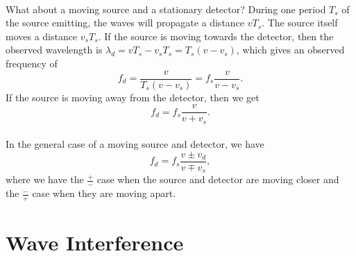 \documentclass[../classical_mechanics.tex]{subfiles}
\begin{document}
        \paragraph{}
        What about a moving source and a stationary detector?
        During one period $T_s$ of the source emitting, the waves will propagate a distance $vT_s$.
        The source itself moves a distance $v_sT_s$.
        If the source is moving towards the detector, then the observed wavelength is $\lambda_d=vT_s-v_sT_s=T_s(v-v_s)$, which gives an observed frequency of
        \begin{equation}
            f_d=\frac{v}{T_s(v-v_s)}=f_s\frac{v}{v-v_s}.
        \end{equation}
        If the source is moving away from the detector, then we get
        \begin{equation}
            f_d=f_s\frac{v}{v+v_s}.
        \end{equation}

        \paragraph{}
        In the general case of a moving source and detector, we have
        \begin{equation}
            f_d=f_s\frac{v\pm v_d}{v\mp v_s},
        \end{equation}
        where we have the $\frac{+}{-}$ case when the source and detector are moving closer and the $\frac{-}{+}$ case when they are moving apart.

    \section{Wave Interference}\label{sec:wave-interference}
\end{document}

